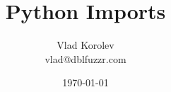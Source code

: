 \documentclass{beamer}
\title{Python Imports}
\subtitle{}
\author{Vlad Korolev \\ vlad@dblfuzzr.com}
\date[]{ \today}
\begin{document}
{
\begin{frame}
  \titlepage
\end{frame}
}



\end{document}
